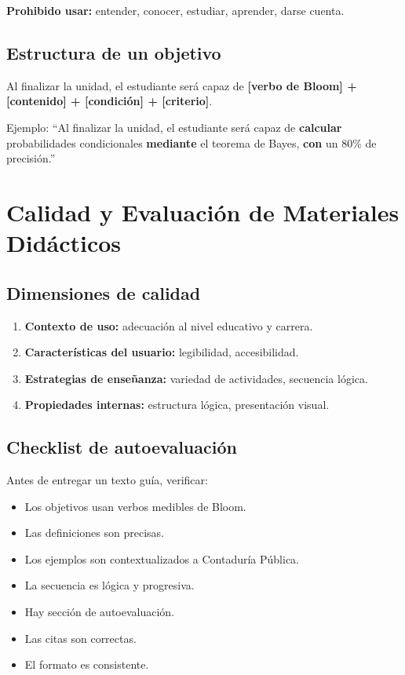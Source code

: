 \documentclass[12pt,a4paper]{article}
\begin{document}
\textbf{Prohibido usar:} entender, conocer, estudiar, aprender, darse cuenta.

\subsection{Estructura de un objetivo}

Al finalizar la unidad, el estudiante será capaz de \textbf{[verbo de Bloom] + [contenido] + [condición] + [criterio]}.

Ejemplo: ``Al finalizar la unidad, el estudiante será capaz de \textbf{calcular} probabilidades condicionales \textbf{mediante} el teorema de Bayes, \textbf{con} un 80\% de precisión.''

\section{Calidad y Evaluación de Materiales Didácticos}

\subsection{Dimensiones de calidad}

\begin{enumerate}
    \item \textbf{Contexto de uso:} adecuación al nivel educativo y carrera.
    \item \textbf{Características del usuario:} legibilidad, accesibilidad.
    \item \textbf{Estrategias de enseñanza:} variedad de actividades, secuencia lógica.
    \item \textbf{Propiedades internas:} estructura lógica, presentación visual.
\end{enumerate}

\subsection{Checklist de autoevaluación}

Antes de entregar un texto guía, verificar:
\begin{itemize}
    \item Los objetivos usan verbos medibles de Bloom.
    \item Las definiciones son precisas.
    \item Los ejemplos son contextualizados a Contaduría Pública.
    \item La secuencia es lógica y progresiva.
    \item Hay sección de autoevaluación.
    \item Las citas son correctas.
    \item El formato es consistente.
\end{itemize}
\end{document}

